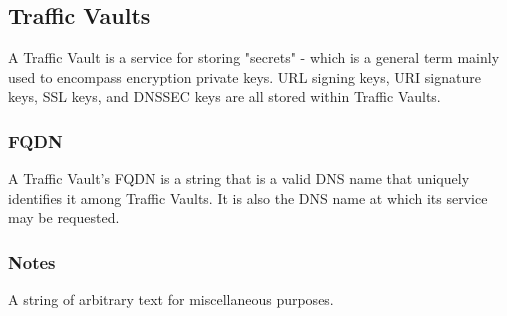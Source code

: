 %
%

\subsection{Traffic Vaults}
A Traffic Vault is a service for storing "secrets" - which is a general term
mainly used to encompass encryption private keys. URL signing keys, URI
signature keys, SSL keys, and DNSSEC keys are all stored within Traffic Vaults.



\subsubsection{FQDN}
A Traffic Vault's FQDN is a string that is a valid DNS name that uniquely
identifies it among Traffic Vaults. It is also the DNS name at which its service
may be requested.

\subsubsection{Notes}
A string of arbitrary text for miscellaneous purposes.
